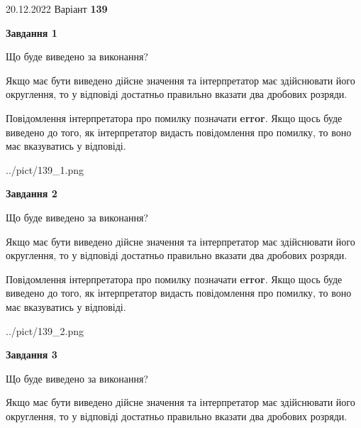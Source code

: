 \documentclass[12pt, ukrainian]{article}
\begin{document}
{20.12.2022 Варіант \No \textbf { 139 }\par}
{
\begin {Large}

{\begin {center}\textbf{Завдання 1}\end {center}}\par
Що буде виведено за виконання? \par

Якщо має бути виведено дійсне значення та інтерпретатор має здійснювати його округлення, 
то у відповіді достатньо правильно вказати два дробових розряди.

Повідомлення інтерпретатора про помилку позначати \textbf{error}.
Якщо щось буде виведено до того, як інтерпретатор видасть повідомлення про помилку, 
то воно має вказуватись у відповіді. \par

\begin{center}
	{../pict/139_1.png}
\end{center}
\newpage

{\begin {center}\textbf{Завдання 2}\end {center}}\par
Що буде виведено за виконання? \par

Якщо має бути виведено дійсне значення та інтерпретатор має здійснювати його округлення, 
то у відповіді достатньо правильно вказати два дробових розряди.

Повідомлення інтерпретатора про помилку позначати \textbf{error}.
Якщо щось буде виведено до того, як інтерпретатор видасть повідомлення про помилку, 
то воно має вказуватись у відповіді. \par

\begin{center}
	{../pict/139_2.png}
\end{center}
\newpage

{\begin {center}\textbf{Завдання 3}\end {center}}\par
Що буде виведено за виконання? \par

Якщо має бути виведено дійсне значення та інтерпретатор має здійснювати його округлення, 
то у відповіді достатньо правильно вказати два дробових розряди.


\end{Large}}
\end{document}
